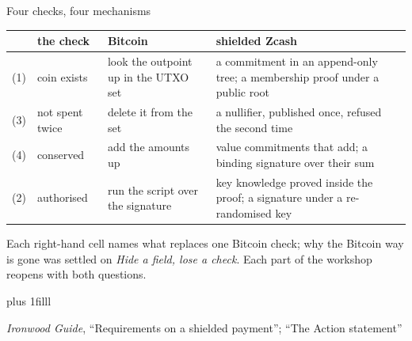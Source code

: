 \documentclass[aspectratio=169,11pt]{beamer}
\newcommand{\src}[1]{\par\vskip0pt plus 1filll
  {\fontsize{6}{7.2}\selectfont\color{arbdim}\raggedright #1\par}}
\begin{document}
\begin{frame}{Four checks, four mechanisms}
\begin{center}\small
\begin{tabular}{@{}clp{}p{}@{}}
\toprule
 & the check & Bitcoin & shielded Zcash \\
\midrule
(1) & coin exists & look the outpoint up in the UTXO set & a commitment
  in an append-only tree; a membership proof under a public root \\
(3) & not spent twice & delete it from the set & a nullifier, published
  once, refused the second time \\
(4) & conserved & add the amounts up & value commitments that add; a
  binding signature over their sum \\
(2) & authorised & run the script over the signature & key knowledge
  proved inside the proof; a signature under a re-randomised key \\
\bottomrule
\end{tabular}
\end{center}
\medskip
Each right-hand cell names what replaces one Bitcoin check; why the
Bitcoin way is gone was settled on \emph{Hide a field, lose a check}. Each
part of the workshop reopens with both questions.
\src{\emph{Ironwood Guide}, ``Requirements on a shielded payment'';
  ``The Action statement''}
\end{frame}
\end{document}
